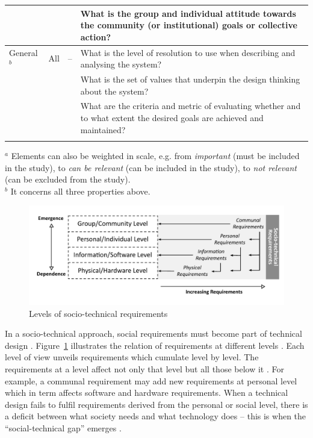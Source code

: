 \begin{table}
\begin{tabular}{>{\raggedright}p{2cm}>{\raggedright}p{1.6cm}>{\raggedright}p{1.7cm}p{6.2cm}}
   &&& What is the group and individual attitude towards the community (or institutional) goals or collective action? \\ \hline\noalign{\smallskip}
General $^b$ & All  &  --  & What is the level of resolution to use when describing and analysing the system? \\
&&& What is the set of values that underpin the design thinking about the system? \\
&&& What are the criteria and metric of evaluating whether and to what extent the desired goals are achieved and maintained? \\
\noalign{\smallskip}\hline\noalign{\smallskip}
\end{tabular}
$^a$ Elements can also be weighted in scale, e.g. from \textit{important} (must be included in the study), to \textit{can be relevant} (can be included in the study), to \textit{not relevant} (can be excluded from the study).\\
$^b$ It concerns all three properties above. 
\end{table}
%
%
\begin{figure}
\sidecaption
\includegraphics[scale=.68]{img/sts_requirements.pdf}
\caption{Levels of socio-technical requirements \cite{Whitworth2009a}}
\label{fig:sts_requirements} 
\end{figure}
% 
%
In a socio-technical approach, social requirements must become part of technical design \cite{Whitworth2014}. Figure~\ref{fig:sts_requirements} illustrates the relation of requirements at different levels \cite{Whitworth2009a}. Each level of view unveils requirements which cumulate level by level. The requirements at a level affect not only that level but all those below it \cite{Whitworth2009a}. For example, a communal requirement may add new requirements at personal level which in term affects software and hardware requirements. When a technical design fails to fulfil requirements derived from the personal or social level, there is a deficit  between  what  society  needs  and  what technology does -- this is when the ``social-technical  gap''  emerges \cite{Whitworth2014}. 

